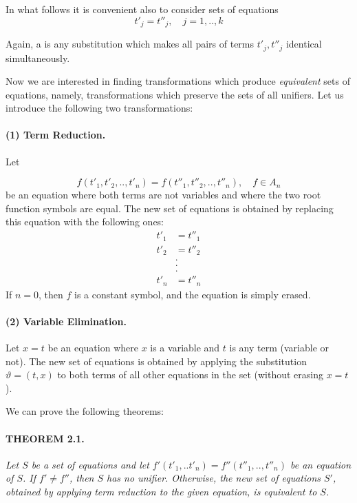 In what follows it is convenient also to consider sets of equations
\[t'_j=t''_j, \quad j=1,..,k\]

Again, a  is any substitution which makes all pairs of terms
$t'_j,t''_j$ identical simultaneously.

Now we are interested in finding transformations which produce \emph{equivalent}
sets of equations, namely, transformations which preserve the sets of all
unifiers.
Let us introduce the following two transformations:

\paragraph{(1) Term Reduction.} Let

\begin{equation}\label{mm1}
f(t'_1,t'_2,..,t'_n)=f(t''_1,t''_2,..,t''_n), \quad f \in A_n
\end{equation} 
be an equation where both terms are not variables and where the two root
function symbols are equal. The new set of equations is obtained by replacing
this equation with the following ones: 
\begin{align}\label{mm2}
t'_1 &= t''_1\\
t'_2 &= t''_2\\
&.\\
&.\\
&.\\
t'_n &= t''_n
\end{align}
If $n = 0$, then $f$ is a constant symbol, and the equation is simply erased.

\paragraph{(2) Variable Elimination.} Let $x = t$ be an equation where $x$ is a
variable and $t$ is any term (variable or not). The new set of equations is
obtained by applying the substitution $\vartheta={(t,x)}$ to both terms of all
other equations in the set (without erasing $x = t$).

We can prove the following theorems: 

\paragraph{THEOREM 2.1.} \textit{Let $S$ be a set of equations and let
$f'(t'_1,..t'_n)=f''(t''_1,..,t''_n)$ be an equation of $S$. If $f' \neq f''$,
then $S$ has no unifier. Otherwise, the new set of equations $S'$, obtained by
applying term reduction to the given equation, is equivalent to $S$.}

